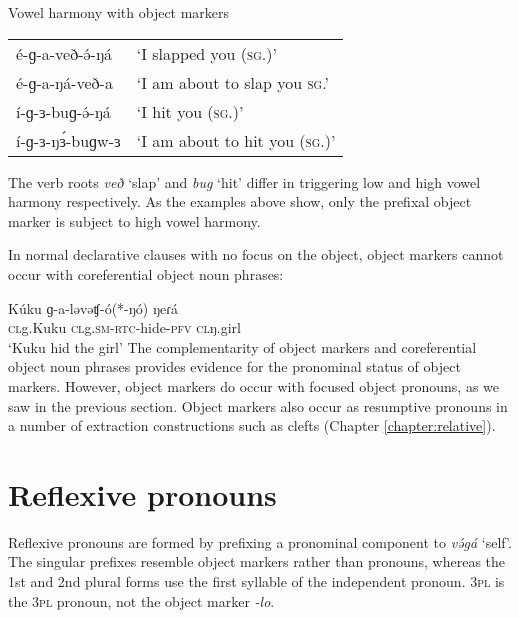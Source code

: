 \ea Vowel harmony with object markers
\begin{tabular}[t]{ll}
	é-ɡ-a-veð-ə́-ŋá	& ‘I slapped you (\textsc{sg}.)’ \\
	 é-ɡ-a-ŋá-veð-a  &	‘I am about to slap you \textsc{sg}.’\\
	í-ɡ-ɜ-buɡ-ə́-ŋá 	 &	‘I hit you (\textsc{sg}.)’	\\
	 í-ɡ-ɜ-ŋɜ́-buɡw-ɜ	& ‘I am about to hit you (\textsc{sg}.)’ \\
	\end{tabular}
\z

The verb roots \textit{veð} `slap' and \textit{bug} `hit' differ in triggering low and high vowel harmony respectively. As the examples above show, only the prefixal object marker is subject to high vowel harmony.

In normal declarative clauses with no focus on the object, object markers cannot occur with coreferential object noun phrases:

\ea	\label{ex:ch7:objpro}
\gll	Kúku        ɡ-a-ləvəʧ-ó(*-ŋó)	        ŋeɾá		 \\
			\textsc{cl}g.Kuku   \textsc{cl}g.\textsc{sm}-\textsc{rtc}-hide-\textsc{pfv}   \textsc{cl}ŋ.girl	 \\
	\glt		‘Kuku hid the girl’				
\z
The complementarity of object markers and coreferential object noun phrases  provides evidence for the pronominal status of object markers. However, object markers do occur with focused object pronouns, as we saw in the previous section. Object markers also occur as resumptive pronouns in a number of extraction constructions such as clefts (Chapter \ref{chapter:relative}).

\section{Reflexive pronouns}\label{sec:ch7:reflpro}

Reflexive pronouns are formed by prefixing a pronominal component to \textit{və́gá} ‘self’. The singular prefixes resemble object markers rather than pronouns, whereas the 1st and 2nd plural forms use the first syllable of the independent pronoun. 3\textsc{pl} is the 3\textsc{pl} pronoun, not the object marker \textit{-lo}. %

